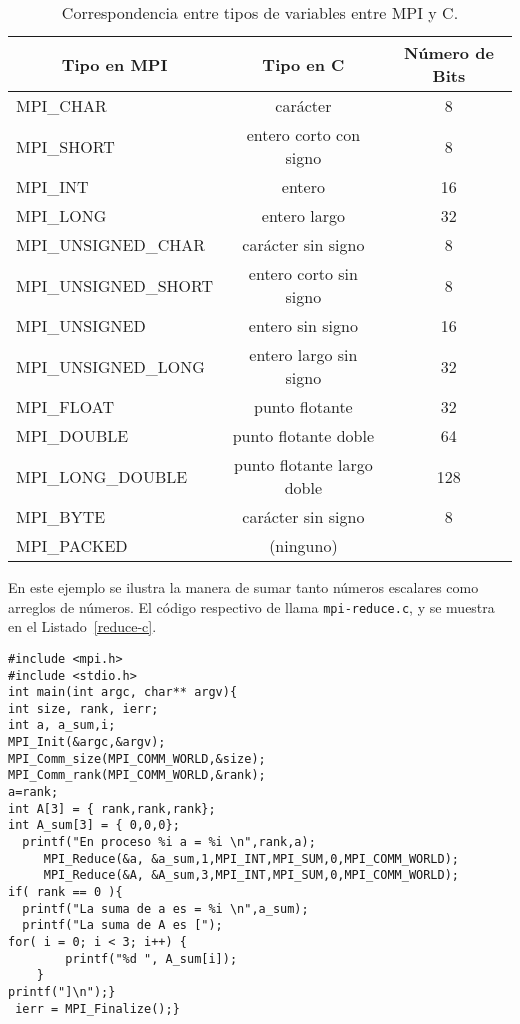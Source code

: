 \documentclass[letter]{jpconf}
\begin{document}
\begin{table}[htbp]
\begin{center}
\begin{tabular}{|l|c|c|}
\hline
\hline
\hline \hline
\multicolumn{1}{c}{\textbf{Tipo en MPI}} & 
  \multicolumn{1}{c}{\textbf{Tipo en C}} & 
  \multicolumn{1}{c}{\textbf{N\'umero de Bits}}\\
 \hline \hline
MPI\_CHAR &  car\'acter & 8 \\ \hline
MPI\_SHORT & entero corto con signo & 8\\ \hline
MPI\_INT &  entero    & 16\\ \hline
MPI\_LONG &  entero largo  & 32\\ \hline
MPI\_UNSIGNED\_CHAR &  car\'acter sin signo  & 8\\ \hline
MPI\_UNSIGNED\_SHORT & entero corto sin signo  & 8 \\ \hline
MPI\_UNSIGNED & entero sin signo & 16\\ \hline
MPI\_UNSIGNED\_LONG & entero largo sin signo  & 32\\ \hline
MPI\_FLOAT & punto flotante  & 32\\ \hline
MPI\_DOUBLE & punto flotante doble  & 64\\ \hline
MPI\_LONG\_DOUBLE & punto flotante largo doble  & 128\\ \hline
MPI\_BYTE & car\'acter sin signo  & 8 \\ \hline
MPI\_PACKED & (ninguno)  & \\ \hline

\end{tabular}
\caption{\label{tiposC} Correspondencia entre tipos de variables entre MPI y C.}
\end{center}
\end{table}

En este ejemplo se ilustra la manera de  sumar tanto n\'umeros escalares como arreglos de n\'umeros. El c\'odigo respectivo de llama  \texttt{mpi-reduce.c},  
y se muestra en el Listado~\ref{reduce-c}.
\begin{lstlisting}[float,floatplacement=H,label=reduce-c,caption=Listado del programa  \texttt{mpi-reduce.c} en C]
#include <mpi.h>
#include <stdio.h>
int main(int argc, char** argv){
int size, rank, ierr;
int a, a_sum,i;
MPI_Init(&argc,&argv);
MPI_Comm_size(MPI_COMM_WORLD,&size);
MPI_Comm_rank(MPI_COMM_WORLD,&rank);
a=rank;
int A[3] = { rank,rank,rank};
int A_sum[3] = { 0,0,0};
  printf("En proceso %i a = %i \n",rank,a);
     MPI_Reduce(&a, &a_sum,1,MPI_INT,MPI_SUM,0,MPI_COMM_WORLD);
     MPI_Reduce(&A, &A_sum,3,MPI_INT,MPI_SUM,0,MPI_COMM_WORLD);
if( rank == 0 ){
  printf("La suma de a es = %i \n",a_sum);
  printf("La suma de A es [");
for( i = 0; i < 3; i++) {
        printf("%d ", A_sum[i]);
    }
printf("]\n");}
 ierr = MPI_Finalize();}
 \end{lstlisting}
 
\end{document}

